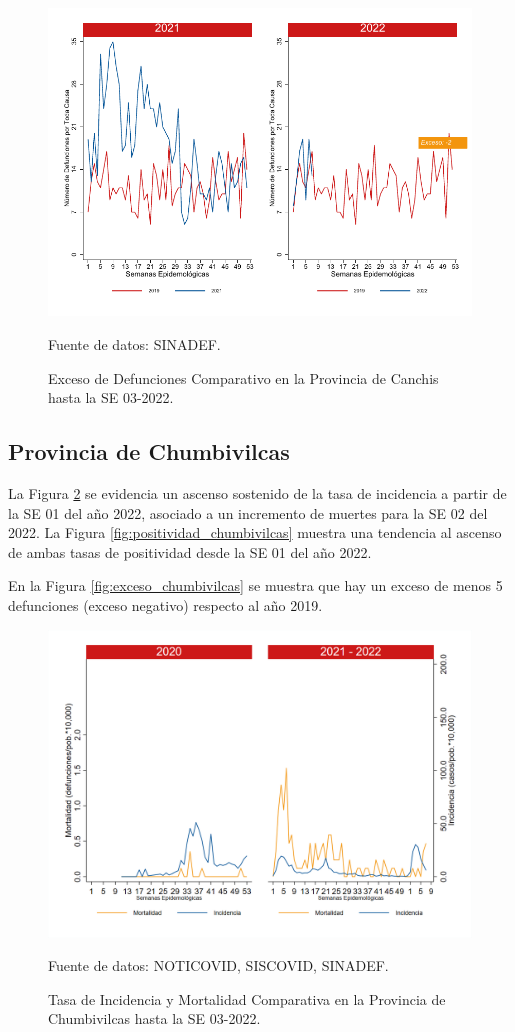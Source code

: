 \documentclass[12pt,a4paper,openany]{book}
\begin{document}
		\begin{figure}[h]
			\caption{Exceso de Defunciones Comparativo en la Provincia de Canchis hasta la SE 03-2022.}\label{fig:exceso_canchis}
			\begin{center}
				\includegraphics[width=0.7\linewidth]{../figuras/exceso_5.pdf}
			\end{center}
			{\footnotesize {Fuente de datos: SINADEF.}}
		\end{figure}
		
		\clearpage
		
		\subsection*{Provincia de Chumbivilcas}
		\noindent La Figura \ref{fig:inc_mort_chumbivilcas} se evidencia un ascenso sostenido de la tasa de incidencia a partir de la SE 01 del año 2022, asociado a un incremento de muertes para la SE 02 del 2022.  
		\noindent La Figura \ref{fig:positividad_chumbivilcas} muestra una tendencia al ascenso de ambas tasas de positividad desde la SE 01 del año 2022. 
		
		En la Figura \ref{fig:exceso_chumbivilcas} se muestra que hay un exceso de menos 5 defunciones (exceso negativo) respecto al año 2019.
		
		\begin{figure}[h]
			\caption{Tasa de Incidencia y Mortalidad Comparativa en la Provincia de Chumbivilcas hasta la SE 03-2022.}\label{fig:inc_mort_chumbivilcas}
			\begin{center}
				\includegraphics[width=0.7\linewidth]{../figuras/incidencia_mortalidad_20_21_6.png}
			\end{center}
			{\footnotesize {Fuente de datos: NOTICOVID, SISCOVID, SINADEF.}}
		\end{figure}
		
\end{document}
